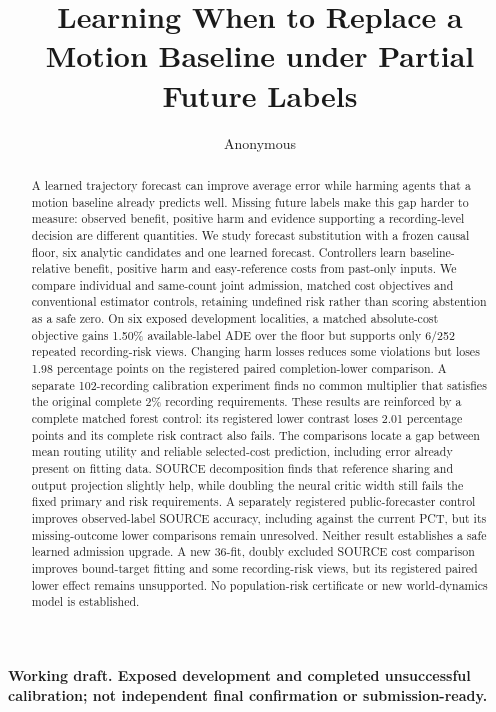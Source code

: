\documentclass[10pt,twocolumn,letterpaper]{article}
\title{Learning When to Replace a Motion Baseline under Partial Future Labels}\author{Anonymous}
\begin{document}
\raggedbottom\maketitle
\textbf{Working draft. Exposed development and completed unsuccessful calibration; not independent final confirmation or submission-ready.}

\begin{abstract}
A learned trajectory forecast can improve average error while harming agents
that a motion baseline already predicts well. Missing future labels make this
gap harder to measure: observed benefit, positive harm and evidence supporting
a recording-level decision are different quantities. We study forecast
substitution with a frozen causal floor, six analytic candidates and one learned
forecast. Controllers learn baseline-relative benefit, positive harm and
easy-reference costs from past-only inputs. We compare individual and
same-count joint admission, matched cost objectives and conventional estimator
controls, retaining undefined risk rather than scoring abstention as a safe zero.
On six exposed development localities, a matched absolute-cost objective gains
1.50\% available-label ADE over the floor but supports only 6/252 repeated
recording-risk views. Changing harm losses reduces some violations but loses
1.98 percentage points on the registered paired completion-lower comparison.
A separate 102-recording calibration experiment finds no common multiplier
that satisfies the original complete 2\% recording requirements. These results
are reinforced by a complete matched forest control: its registered lower
contrast loses 2.01 percentage points and its complete risk contract also fails.
The comparisons
locate a gap between mean routing utility and reliable selected-cost prediction,
including error already present on fitting data. SOURCE decomposition finds
that reference sharing and output projection slightly help, while doubling
the neural critic width still fails the fixed primary and risk requirements.
A separately registered public-forecaster control improves observed-label
SOURCE accuracy, including against the current PCT, but its missing-outcome
lower comparisons remain unresolved. Neither result establishes a safe learned
admission upgrade. A new 36-fit, doubly excluded SOURCE cost comparison improves
bound-target fitting and some recording-risk views, but its registered paired
lower effect remains unsupported. No population-risk certificate or new
world-dynamics model is established.

\end{abstract}
\end{document}
